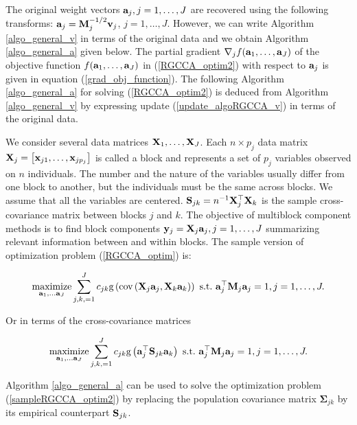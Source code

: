 \documentclass[
]{jss}
\begin{document}
The original weight vectors \(\mathbf{a}_j, j = 1,\ldots, J\) are recovered
using the following transforms: \(\mathbf{a}_j = \mathbf{M}_j^{-1/2} \mathbf{v}_j\),
\(j = 1,\ldots, J\). However, we can write Algorithm
\ref{algo_general_v} in terms of the original data and we obtain
Algorithm \ref{algo_general_a} given below. The partial gradient
\(\mathbf{\nabla}_j f(\mathbf{a}_1, \ldots, \mathbf{a}_J)\) of the objective function
\(f(\mathbf{a}_1, \ldots, \mathbf{a}_J)\) in (\ref{RGCCA_optim2}) with respect
to \(\mathbf{a}_j\) is given in equation (\ref{grad_obj_function}). The
following Algorithm \ref{algo_general_a} for solving
(\ref{RGCCA_optim2}) is deduced from Algorithm \ref{algo_general_v} by
expressing update (\ref{update_algoRGCCA_v}) in terms of the original
data.

We consider several data matrices \(\mathbf{X}_1, \ldots, \mathbf{X}_J\). Each
\(n \times p_j\) data matrix
\(\mathbf{X}_j = \left[\mathbf{x}_{j1}, \ldots, \mathbf{x}_{jp_j} \right]\) is called a
block and represents a set of \(p_j\) variables observed on \(n\)
individuals. The number and the nature of the variables usually differ
from one block to another, but the individuals must be the same across
blocks. We assume that all the variables are centered.
\(\mathbf{S}_{jk} = n^{-1}\mathbf{X}_j^\top \mathbf{X}_k\) is the sample
cross-covariance matrix between blocks \(j\) and \(k\). The objective of
multiblock component methods is to find block components
\(\mathbf{y}_j = \mathbf{X}_j \mathbf{a}_j, j=1, \ldots, J\) summarizing relevant
information between and within blocks. The sample version of
optimization problem (\ref{RGCCA_optim}) is:

\begin{equation}
\underset{\mathbf{a}_1, \ldots \mathbf{a}_J}{\text{maximize}} \sum_{j,k,=1}^J c_{jk} \text{g}\left(\text{cov}\left(\mathbf{X}_j\mathbf{a}_j, \mathbf{X}_k \mathbf{a}_k \right)\right) \text{~s.t.~} \mathbf{a}_j^\top \mathbf{M}_j \mathbf{a}_j = 1,  j=1, \ldots, J.
\label{sampleRGCCA_optim}
\end{equation}

Or in terms of the cross-covariance matrices

\begin{equation}
\underset{\mathbf{a}_1, \ldots \mathbf{a}_J}{\text{maximize}} \sum_{j,k,=1}^J c_{jk} \text{g}\left(\mathbf{a}_j^\top\mathbf{S}_{jk} \mathbf{a}_k\right) \text{~s.t.~} \mathbf{a}_j^\top \mathbf{M}_j \mathbf{a}_j = 1,  j=1, \ldots, J.
\label{sampleRGCCA_optim2}
\end{equation}

Algorithm \ref{algo_general_a} can be used to solve the optimization
problem (\ref{sampleRGCCA_optim2}) by replacing the population
covariance matrix \(\boldsymbol \Sigma_{jk}\) by its empirical
counterpart \(\mathbf{S}_{jk}\).
\end{document}
